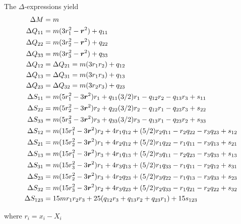 The $\Delta$-expressions yield
\begin{align*}
\Delta M &= m \\
\Delta Q_{11} &= m (3 r_1^2 - \boldsymbol{r}^2) + q_{11} \nonumber \\
\Delta Q_{22} &= m (3 r_2^2 - \boldsymbol{r}^2) + q_{22} \nonumber \\
\Delta Q_{33} &= m (3 r_3^2 - \boldsymbol{r}^2) + q_{33} \nonumber \\
\Delta Q_{12} &= \Delta Q_{21} = m ( 3 r_1 r_2 ) + q_{12} \nonumber \\
\Delta Q_{13} &= \Delta Q_{31} = m ( 3 r_1 r_3 ) + q_{13} \nonumber \\
\Delta Q_{23} &= \Delta Q_{32} = m ( 3 r_2 r_3 ) + q_{23} \nonumber \\
\Delta S_{11} &= m ( 5 r_1^2 - 3 \boldsymbol{r}^2 ) r_1 + q_{11} (3/2) r_1 - q_{12} r_2 - q_{13} r_3 + s_{11} \nonumber \\
\Delta S_{22} &= m ( 5 r_2^2 - 3 \boldsymbol{r}^2 ) r_2 + q_{22} (3/2) r_2 - q_{12} r_1 - q_{23} r_3 + s_{22} \nonumber \\
\Delta S_{33} &= m ( 5 r_3^2 - 3 \boldsymbol{r}^2 ) r_3 + q_{33} (3/2) r_3 - q_{13} r_1 - q_{23} r_2 + s_{33} \nonumber \\
\Delta S_{12} &= m ( 15 r_1^2 - 3 \boldsymbol{r}^2 ) r_2 + 4 r_1 q_{12} + (5/2) r_2 q_{11} - r_2 q_{22} - r_3 q_{23} + s_{12} \\
\Delta S_{21} &= m ( 15 r_2^2 - 3 \boldsymbol{r}^2 ) r_1 + 4 r_2 q_{12} + (5/2) r_1 q_{22} - r_1 q_{11} - r_3 q_{13} + s_{21} \\
\Delta S_{13} &= m ( 15 r_1^2 - 3 \boldsymbol{r}^2 ) r_3 + 4 r_1 q_{13} + (5/2) r_3 q_{11} - r_2 q_{23} - r_3 q_{33} + s_{13} \\
\Delta S_{31} &= m ( 15 r_3^2 - 3 \boldsymbol{r}^2 ) r_1 + 4 r_3 q_{13} + (5/2) r_1 q_{33} - r_1 q_{11} - r_2 q_{12} + s_{31} \\
\Delta S_{23} &= m ( 15 r_2^2 - 3 \boldsymbol{r}^2 ) r_3 + 4 r_2 q_{23} + (5/2) r_3 q_{22} - r_1 q_{13} - r_3 q_{33} + s_{23} \\
\Delta S_{32} &= m ( 15 r_3^2 - 3 \boldsymbol{r}^2 ) r_2 + 4 r_3 q_{23} + (5/2) r_2 q_{33} - r_1 q_{21} - r_2 q_{22} + s_{32} \\
\Delta S_{123} &=15 m r_1 r_2 r_3 + 25 ( q_{12}  r_3 + q_{13} r_2 + q_{23} r_1) + 15 s_{123} 
\end{align*}

where $r_i = x_i - X_i$

